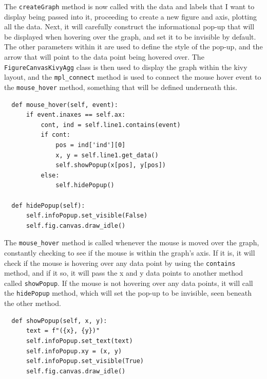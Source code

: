 \documentclass{article}
\begin{document}
\vspace{0.3cm}
The \texttt{createGraph} method is now called with the data and labels that I want to display being passed into it, proceeding to create a new figure and axis, plotting all the data. Next, it will carefully construct the informational pop-up that will be displayed when hovering over the graph, and set it to be invisible by default. The other parameters within it are used to define the style of the pop-up, and the arrow that will point to the data point being hovered over. The \texttt{FigureCanvasKivyAgg} class is then used to display the graph within the kivy layout, and the \texttt{mpl\_connect} method is used to connect the mouse hover event to the \texttt{mouse\_hover} method, something that will be defined underneath this.\\\vspace{0.3cm}

\newpage
\begin{verbatim}
  def mouse_hover(self, event):
      if event.inaxes == self.ax:
          cont, ind = self.line1.contains(event)
          if cont:
              pos = ind['ind'][0]
              x, y = self.line1.get_data()
              self.showPopup(x[pos], y[pos])
          else:
              self.hidePopup()

  def hidePopup(self):
      self.infoPopup.set_visible(False)
      self.fig.canvas.draw_idle()
\end{verbatim}

\vspace{0.3cm}
The \texttt{mouse\_hover} method is called whenever the mouse is moved over the graph, constantly checking to see if the mouse is within the graph's axis. If it is, it will check if the mouse is hovering over any data point by using the \texttt{contains} method, and if it so, it will pass the x and y data points to another method called \texttt{showPopup}. If the mouse is not hovering over any data points, it will call the \texttt{hidePopup} method, which will set the pop-up to be invisible, seen beneath the other method.\\\vspace{0.3cm}

\begin{verbatim}
  def showPopup(self, x, y):
      text = f"({x}, {y})"
      self.infoPopup.set_text(text)
      self.infoPopup.xy = (x, y)
      self.infoPopup.set_visible(True)
      self.fig.canvas.draw_idle()
\end{verbatim}
\end{document}
